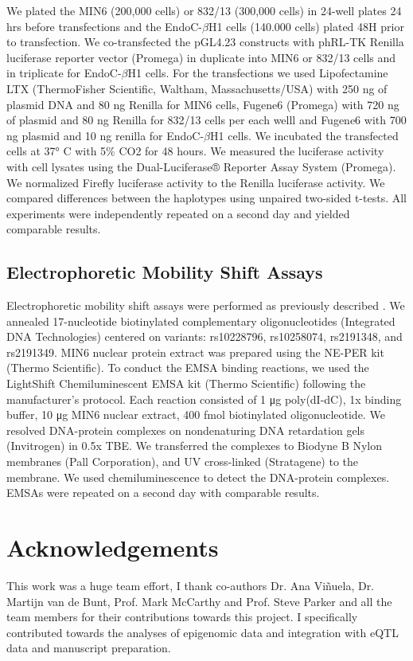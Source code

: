 We plated the MIN6 (200,000 cells) or 832/13 (300,000 cells) in 24-well plates 24 hrs before transfections and the EndoC-$\beta$H1 cells (140.000 cells) plated 48H prior to transfection. We co-transfected the pGL4.23 constructs with phRL-TK Renilla luciferase reporter vector (Promega) in duplicate into MIN6 or 832/13 cells and in triplicate for EndoC-$\beta$H1 cells. For the transfections we used Lipofectamine LTX (ThermoFisher Scientific, Waltham, Massachusetts/USA) with 250 ng of plasmid DNA and 80 ng Renilla for MIN6 cells, Fugene6 (Promega) with 720 ng of plasmid and 80 ng Renilla for 832/13 cells per each welll and Fugene6 with 700 ng plasmid and 10 ng renilla for EndoC-$\beta$H1 cells. We incubated the transfected cells at 37° C with 5\% CO2 for 48 hours. We measured the luciferase activity with cell lysates using the Dual-Luciferase® Reporter Assay System (Promega). We normalized Firefly luciferase activity to the Renilla luciferase activity. We compared differences between the haplotypes using unpaired two-sided t-tests. All experiments were independently repeated on a second day and yielded comparable results.

\subsection{Electrophoretic Mobility Shift Assays}
Electrophoretic mobility shift assays were performed as previously described \cite{fogartyIdentificationRegulatoryVariant2014}. We annealed 17-nucleotide biotinylated complementary oligonucleotides (Integrated DNA Technologies) centered on variants: rs10228796, rs10258074, rs2191348, and rs2191349. MIN6 nuclear protein extract was prepared using the NE-PER kit (Thermo Scientific). To conduct the EMSA binding reactions, we used the LightShift Chemiluminescent EMSA kit (Thermo Scientific) following the manufacturer's protocol. Each reaction consisted of 1 μg poly(dI-dC), 1x binding buffer, 10 μg MIN6 nuclear extract, 400 fmol biotinylated oligonucleotide. We resolved DNA-protein complexes on nondenaturing DNA retardation gels (Invitrogen) in 0.5x TBE. We transferred the complexes to Biodyne B Nylon membranes (Pall Corporation), and UV cross-linked (Stratagene) to the membrane. We used chemiluminescence to detect the DNA-protein complexes. EMSAs were repeated on a second day with comparable results.

\section{Acknowledgements}
This work was a huge team effort, I thank co-authors Dr. Ana Vi\~{n}uela, Dr. Martijn van de Bunt, Prof. Mark McCarthy and Prof. Steve Parker and all the team members for their contributions towards this project. I specifically contributed towards the analyses of epigenomic data and integration with eQTL data and manuscript preparation.  